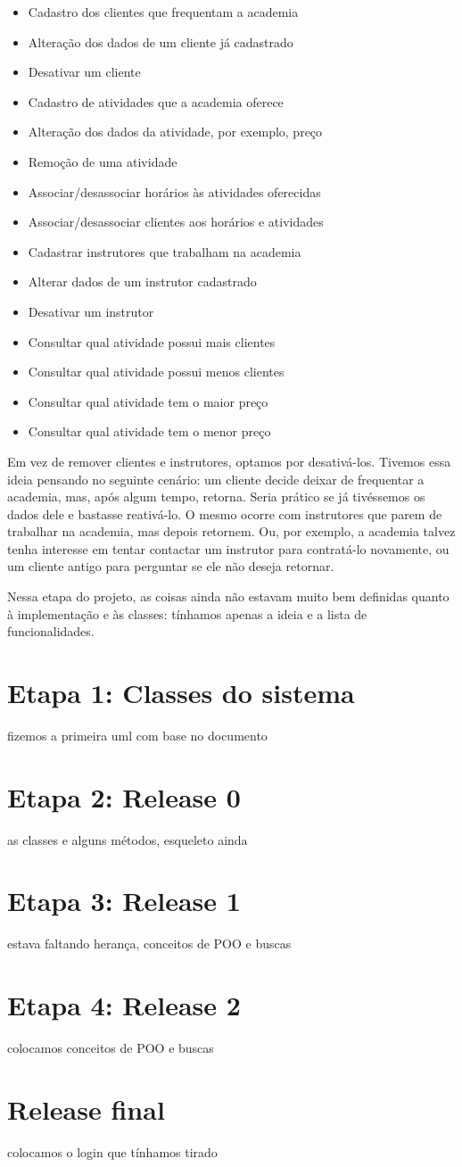 \documentclass[11pt,twoside]{article}
\begin{document}
\begin{itemize}
  \item Cadastro dos clientes que frequentam a academia
  \item Alteração dos dados de um cliente já cadastrado
  \item Desativar um cliente
  \item Cadastro de atividades que a academia oferece
  \item Alteração dos dados da atividade, por exemplo, preço
  \item Remoção de uma atividade
  \item Associar/desassociar horários às atividades oferecidas
  \item Associar/desassociar clientes aos horários e atividades
  \item Cadastrar instrutores que trabalham na academia
  \item Alterar dados de um instrutor cadastrado
  \item Desativar um instrutor
  \item Consultar qual atividade possui mais clientes
  \item Consultar qual atividade possui menos clientes
  \item Consultar qual atividade tem o maior preço
  \item Consultar qual atividade tem o menor preço
\end{itemize}

Em vez de remover clientes e instrutores, optamos por desativá-los. Tivemos essa ideia pensando no seguinte cenário: um cliente
decide deixar de frequentar a academia, mas, após algum tempo, retorna. Seria prático se já tivéssemos os dados dele e bastasse
reativá-lo. O mesmo ocorre com instrutores que parem de trabalhar na academia, mas depois retornem. Ou, por exemplo, a academia
talvez tenha interesse em tentar contactar um instrutor para contratá-lo novamente, ou um cliente antigo para perguntar se ele
não deseja retornar.

Nessa etapa do projeto, as coisas ainda não estavam muito bem definidas quanto à implementação e às classes: tínhamos apenas
a ideia e a lista de funcionalidades.

\section{Etapa 1: Classes do sistema}
fizemos a primeira uml com base no documento
\section{Etapa 2: Release 0}
as classes e alguns métodos, esqueleto ainda
\section{Etapa 3: Release 1}
estava faltando herança, conceitos de POO e buscas
\section{Etapa 4: Release 2}
colocamos conceitos de POO e buscas
\section{Release final}
colocamos o login que tínhamos tirado
\end{document}
